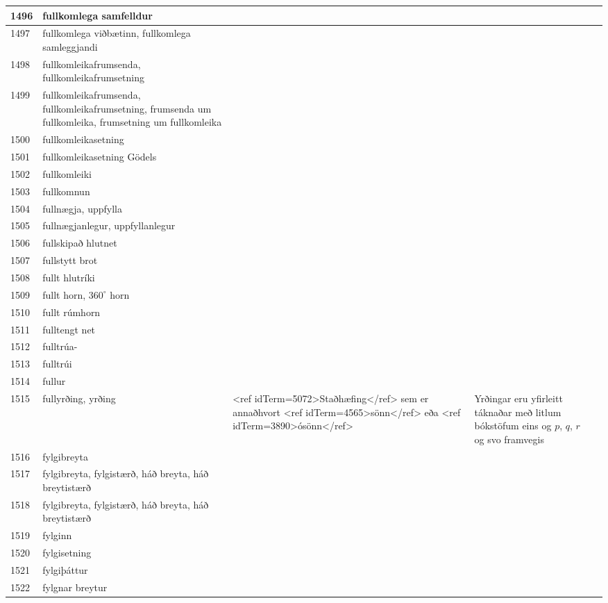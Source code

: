 \begin{longtable}{p{}|p{}|p{}|p{}|p{}}
\hline
1496 & fullkomlega samfelldur &  &  &  \\
\hline
1497 & fullkomlega viðbætinn, fullkomlega samleggjandi &  &  &  \\
\hline
1498 & fullkomleikafrumsenda, fullkomleikafrumsetning &  &  &  \\
\hline
1499 & fullkomleikafrumsenda, fullkomleikafrumsetning, frumsenda um fullkomleika, frumsetning um fullkomleika &  &  &  \\
\hline
1500 & fullkomleikasetning &  &  &  \\
\hline
1501 & fullkomleikasetning Gödels &  &  &  \\
\hline
1502 & fullkomleiki &  &  &  \\
\hline
1503 & fullkomnun &  &  &  \\
\hline
1504 & fullnægja, uppfylla &  &  &  \\
\hline
1505 & fullnægjanlegur, uppfyllanlegur &  &  &  \\
\hline
1506 & fullskipað hlutnet &  &  &  \\
\hline
1507 & fullstytt brot &  &  &  \\
\hline
1508 & fullt hlutríki &  &  &  \\
\hline
1509 & fullt horn, \(360^\circ\) horn &  &  &  \\
\hline
1510 & fullt rúmhorn &  &  &  \\
\hline
1511 & fulltengt net &  &  &  \\
\hline
1512 & fulltrúa- &  &  &  \\
\hline
1513 & fulltrúi &  &  &  \\
\hline
1514 & fullur &  &  &  \\
\hline
1515 & fullyrðing, yrðing & <ref idTerm=5072>Staðhæfing</ref> sem er annaðhvort <ref idTerm=4565>sönn</ref> eða <ref idTerm=3890>ósönn</ref> & Yrðingar eru yfirleitt táknaðar með litlum bókstöfum eins og $p$, $q$, $r$ og svo framvegis &  \\
\hline
1516 & fylgibreyta &  &  &  \\
\hline
1517 & fylgibreyta, fylgistærð, háð breyta, háð breytistærð &  &  &  \\
\hline
1518 & fylgibreyta, fylgistærð, háð breyta, háð breytistærð &  &  &  \\
\hline
1519 & fylginn &  &  &  \\
\hline
1520 & fylgisetning &  &  &  \\
\hline
1521 & fylgiþáttur &  &  &  \\
\hline
1522 & fylgnar breytur &  &  &  \\

\end{longtable}
